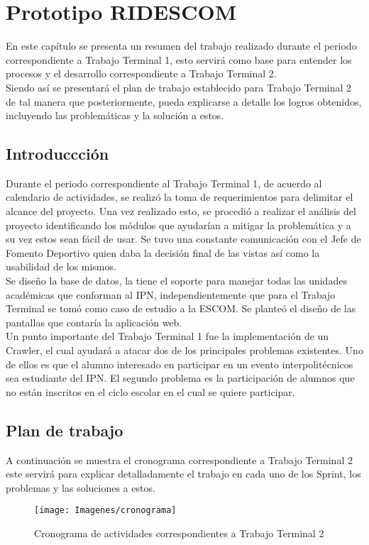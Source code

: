 \chapter{Prototipo RIDESCOM}

	\noindent En este capítulo se presenta un resumen del trabajo realizado durante el periodo correspondiente a Trabajo Terminal 1, esto servirá como base para entender los procesos y el desarrollo correspondiente a Trabajo Terminal 2.\\
	\noindent Siendo así se presentará el plan de trabajo establecido para Trabajo Terminal 2 de tal manera que posteriormente, pueda explicarse a detalle los logros obtenidos, incluyendo las problemáticas y la solución a estos. \\
	
	\section{Introduccción}
	\noindent Durante el periodo correspondiente al Trabajo Terminal 1, de acuerdo al calendario de actividades, se realizó la toma de requerimientos para delimitar el alcance del proyecto. Una vez realizado esto, se procedió a realizar el análisis del proyecto identificando los módulos que ayudarían a mitigar la problemática y a su vez estos sean fácil de usar. Se tuvo una constante comunicación con el Jefe de Fomento Deportivo quien daba la decisión final de las vistas así como la usabilidad de los mismos.\\
	
	\noindent Se diseño la base de datos, la tiene el soporte para manejar todas las unidades académicas que conforman al IPN, independientemente que para el Trabajo Terminal se tomó como caso de estudio a la ESCOM. Se planteó el diseño de las pantallas que contaría la aplicación web.\\
	
	\noindent Un punto importante del Trabajo Terminal 1 fue la implementación de un Crawler, el cual ayudará a atacar dos de los principales problemas existentes. Uno de ellos es que el alumno interesado en participar en un evento interpolitécnicos sea estudiante del IPN. El segundo problema es la participación de alumnos que no están inscritos en el ciclo escolar en el cual se quiere participar.
	
	\section{Plan de trabajo}
	\noindent A continuación se muestra el cronograma correspondiente a Trabajo Terminal 2 este servirá para explicar detalladamente el trabajo en cada uno de los Sprint, los problemas y las soluciones a estos.
	\begin{figure}[hbt!]
		\centering
		\texttt{[image: Imagenes/cronograma]}
		\caption{Cronograma de actividades correspondientes a Trabajo Terminal 2}
		\label{cronograma}
	\end{figure}
\pagebreak

